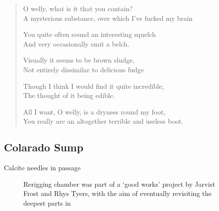 \begin{verse}
\begin{centering}
 O welly, what is it that you contain?\\
A mysterious substance, over which I've fucked my brain

You quite often sound an interesting squelch\\
And very occasionally emit a belch.

Visually it seems to be brown sludge,\\
Not entirely dissimilar to delicious fudge

Though I think I would find it quite incredible,\\
The thought of it being edible.

All I want, O welly, is a dryness round my foot, \\
You really are an altogether terrible and useless boot.\\
 \end{centering} 
\end{verse}

\subsection{Colarado Sump}


       
\begin{marginfigure}
        \centering
        \caption{Calcite needles in \protect{} passage } \label{more calcite needles}
\end{marginfigure}

\begin{figure}[t]
	\checkoddpage \ifoddpage \forcerectofloat \else \forceversofloat \fi
    		\centering
    
   		\caption{Rerigging \protect{} chamber was part of a `good works' project by Jarvist Frost and Rhys Tyers, with the aim of eventually revisiting the deepest parts in \protect{}
    		 }
		 \label{scan}
\end{figure}
          
